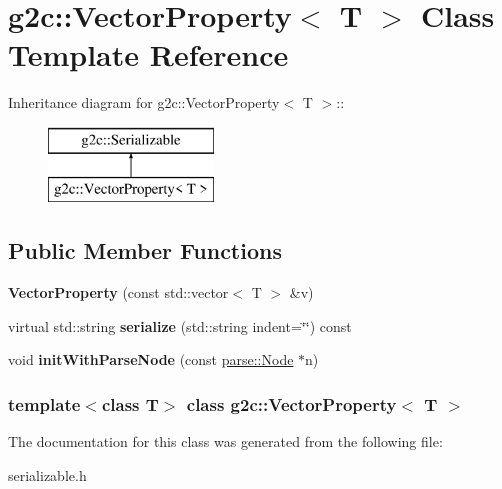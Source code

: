 \hypertarget{classg2c_1_1_vector_property}{
\section{g2c::VectorProperty$<$ T $>$ Class Template Reference}
\label{classg2c_1_1_vector_property}
}
Inheritance diagram for g2c::VectorProperty$<$ T $>$::\begin{figure}[H]
\begin{center}
\leavevmode
\includegraphics[height=2cm]{classg2c_1_1_vector_property}
\end{center}
\end{figure}
\subsection*{Public Member Functions}
\begin{DoxyCompactItemize}
\item 
\hypertarget{classg2c_1_1_vector_property_a50ced1da338478b66b1384acc5486313}{
{\bfseries VectorProperty} (const std::vector$<$ T $>$ \&v)}
\label{classg2c_1_1_vector_property_a50ced1da338478b66b1384acc5486313}

\item 
\hypertarget{classg2c_1_1_vector_property_ae76d578bde928b7684fb3bc822f5fd98}{
virtual std::string {\bfseries serialize} (std::string indent=\char`\"{}\char`\"{}) const }
\label{classg2c_1_1_vector_property_ae76d578bde928b7684fb3bc822f5fd98}

\item 
\hypertarget{classg2c_1_1_vector_property_a826e44f19343e6fc96f54f3b3d364cd0}{
void {\bfseries initWithParseNode} (const \hyperlink{classparse_1_1_node}{parse::Node} $\ast$n)}
\label{classg2c_1_1_vector_property_a826e44f19343e6fc96f54f3b3d364cd0}

\end{DoxyCompactItemize}
\subsubsection*{template$<$class T$>$ class g2c::VectorProperty$<$ T $>$}



The documentation for this class was generated from the following file:\begin{DoxyCompactItemize}
\item 
serializable.h\end{DoxyCompactItemize}
